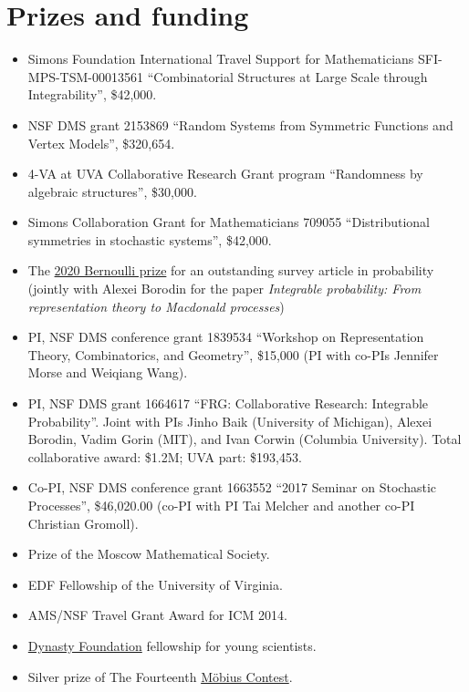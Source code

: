 \documentclass[letterpaper,11pt]{article}
\begin{document}
\section*{Prizes and funding}
\begin{itemize}
	\item [2025--2030:]
	Simons Foundation International Travel Support for Mathematicians SFI-MPS-TSM-00013561
	``Combinatorial Structures at Large Scale through Integrability'',
	\$42,000.

	\item [2022--2026:]
	NSF DMS grant 2153869
	``Random Systems from Symmetric Functions and Vertex Models'',
	\$320,654.

	\item [2022--2024:]
	4-VA at UVA Collaborative Research Grant program
	``Randomness by algebraic structures'',
	\$30,000.
	\item [2020--2025:]
		Simons Collaboration Grant for Mathematicians 709055
		``Distributional symmetries in stochastic systems'',
		\$42,000.
	\item [2019:]
		The \href{https://www.bernoullisociety.org/prizes?id=156}{2020 Bernoulli prize} for an outstanding survey article in probability
		(jointly with Alexei Borodin for the paper \emph{Integrable probability: From representation theory to
		Macdonald processes})
	\item
				[2018-2019:]
				PI, NSF DMS conference grant
				1839534
				``Workshop on Representation Theory, Combinatorics, and Geometry'',
				\$15,000
				(PI with co-PIs Jennifer Morse and Weiqiang Wang).
	\item
	      [2017--2022:] PI, NSF DMS grant 1664617
	      ``FRG: Collaborative Research: Integrable Probability''.
	      Joint with PIs Jinho Baik (University of Michigan), Alexei
	      Borodin, Vadim Gorin (MIT), and Ivan Corwin (Columbia University).
	      Total collaborative award: \$1.2M; UVA part: \$193,453.
	\item
	      [2016--2017:]
	      Co-PI, NSF DMS conference grant 1663552 ``2017 Seminar on Stochastic
	      Processes'', \$46,020.00 (co-PI with PI Tai Melcher and another co-PI
	      Christian Gromoll).
	\item
	      [2015:] Prize of the Moscow Mathematical Society.
	\item
	      [2014--2015:] EDF Fellowship of the University of Virginia.
	\item
	      [2014:] AMS/NSF Travel Grant Award for ICM 2014.
	\item
	      [2010:] \href{https://en.wikipedia.org/wiki/Dynasty_Foundation}{Dynasty Foundation} fellowship for young scientists.
	\item
	      [2010:] Silver prize of The Fourteenth \href{https://www.moebiuscontest.ru/index-en.html}{M\"obius Contest}.
\end{itemize}
\end{document}
